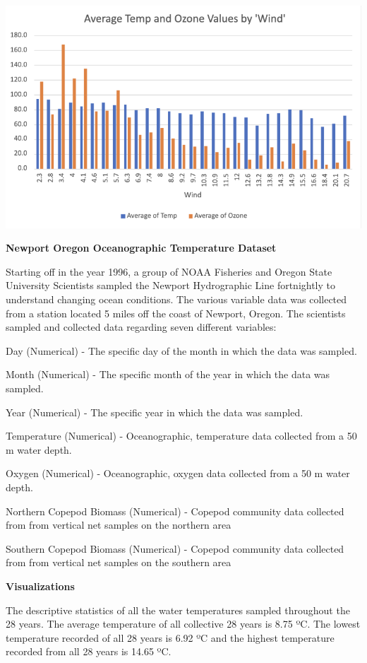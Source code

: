 \documentclass[
  letterpaper,
  DIV=11,
  numbers=noendperiod]{scrreprt}
\begin{document}
\includegraphics{PivotChart3_AverTempOzoneByWind_Pena.png}

\textbf{Newport Oregon Oceanographic Temperature Dataset}

Starting off in the year 1996, a group of NOAA Fisheries and Oregon
State University Scientists sampled the Newport Hydrographic Line
fortnightly to understand changing ocean conditions. The various
variable data was collected from a station located 5 miles off the coast
of Newport, Oregon. The scientists sampled and collected data regarding
seven different variables:

Day (Numerical) - The specific day of the month in which the data was
sampled.

Month (Numerical) - The specific month of the year in which the data was
sampled.

Year (Numerical) - The specific year in which the data was sampled.

Temperature (Numerical) - Oceanographic, temperature data collected from
a 50 m water depth.

Oxygen (Numerical) - Oceanographic, oxygen data collected from a 50 m
water depth.

Northern Copepod Biomass (Numerical) - Copepod community data collected
from from vertical net samples on the northern area

Southern Copepod Biomass (Numerical) - Copepod community data collected
from from vertical net samples on the southern area

\textbf{Visualizations}

The descriptive statistics of all the water temperatures sampled
throughout the 28 years. The average temperature of all collective 28
years is 8.75 ºC. The lowest temperature recorded of all 28 years is
6.92 ºC and the highest temperature recorded from all 28 years is 14.65
ºC.
\end{document}
